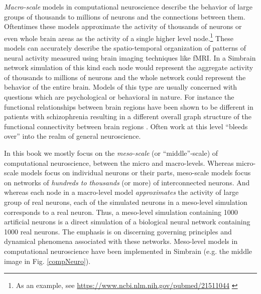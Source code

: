 \emph{Macro-scale} models in computational neuroscience describe the behavior of large groups of thousands to millions of neurons  and the connections between them. Oftentimes these models approximate the activity of thousands of neurons or even whole brain areas as the activity of a single higher level node.\footnote{As an example, see \url{https://www.ncbi.nlm.nih.gov/pubmed/21511044} \cite{cabral2011role}} These models can accurately describe the spatio-temporal organization of patterns of neural activity measured using brain imaging techniques like fMRI. In a Simbrain network simulation of this kind each node would represent the aggregate activity of thousands to millions of neurons and the whole network could represent the behavior of the entire brain. Models of this type are usually concerned with questions which are psychological or behavioral in nature. For instance the functional relationships between brain regions have been shown to be different in patients with schizophrenia resulting in a different overall graph structure of the functional connectivity between brain regions \cite{bullmore2009complex}. Often work at this level ``bleeds over'' into the realm of general neuroscience.

In this book we mostly focus on the \emph{meso-scale} (or ``middle''-scale) of computational neuroscience, between the micro and macro-levels. Whereas micro-scale models focus on individual neurons or their parts, meso-scale models focus on networks of \emph{hundreds to thousands} (or more) of interconnected neurons. And whereas each node in a macro-level model \emph{approximates} the activity of large group of real neurons, each of the simulated neurons in a meso-level simulation  corresponds to a real neuron. Thus, a meso-level simulation containing 1000 artificial neurons is a direct simulation of a biological neural network containing 1000 real neurons. The emphasis is on discerning governing principles and dynamical phenomena associated with these networks. Meso-level models in computational neuroscience have been implemented in Simbrain (e.g. the middle image in Fig. \ref{compNeuro}). 

